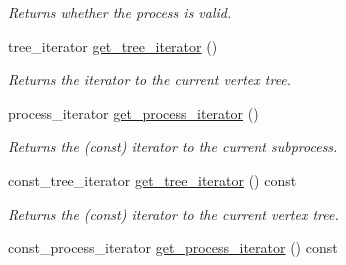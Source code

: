 \begin{DoxyCompactItemize}
\begin{DoxyCompactList}\small\item\em Returns whether the process is valid. \end{DoxyCompactList}\item 
\hypertarget{a00065_a91757a172f26e1c2f31510ac75e44fe1}{}tree\+\_\+iterator \hyperlink{a00065_a91757a172f26e1c2f31510ac75e44fe1}{get\+\_\+tree\+\_\+iterator} ()\label{a00065_a91757a172f26e1c2f31510ac75e44fe1}

\begin{DoxyCompactList}\small\item\em Returns the iterator to the current vertex tree. \end{DoxyCompactList}\item 
\hypertarget{a00065_a4d862eea43cea5aaf0bda13fb48bbd6b}{}process\+\_\+iterator \hyperlink{a00065_a4d862eea43cea5aaf0bda13fb48bbd6b}{get\+\_\+process\+\_\+iterator} ()\label{a00065_a4d862eea43cea5aaf0bda13fb48bbd6b}

\begin{DoxyCompactList}\small\item\em Returns the (const) iterator to the current subprocess. \end{DoxyCompactList}\item 
\hypertarget{a00065_a335247a222e3b6f0d9be9cdfceb2d7c4}{}const\+\_\+tree\+\_\+iterator \hyperlink{a00065_a335247a222e3b6f0d9be9cdfceb2d7c4}{get\+\_\+tree\+\_\+iterator} () const \label{a00065_a335247a222e3b6f0d9be9cdfceb2d7c4}

\begin{DoxyCompactList}\small\item\em Returns the (const) iterator to the current vertex tree. \end{DoxyCompactList}\item 
\hypertarget{a00065_a9d5cd54f6e37e3b23a45e6576f34791d}{}const\+\_\+process\+\_\+iterator \hyperlink{a00065_a9d5cd54f6e37e3b23a45e6576f34791d}{get\+\_\+process\+\_\+iterator} () const \label{a00065_a9d5cd54f6e37e3b23a45e6576f34791d}


\end{DoxyCompactItemize}
